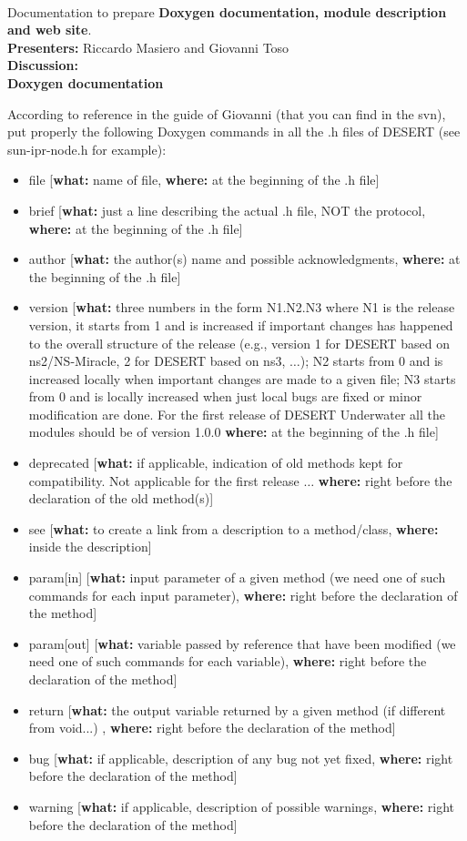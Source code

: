 \documentclass[11pt,journal,draftclsnofoot,onecolumn,twoside,letterpaper]{IEEEtran}
\theoremstyle{definition} \newtheorem{definition}[]{Definition}
\theoremstyle{theorem} \newtheorem{theorem}[]{Theorem}
\begin{document}
\  \\
 Documentation to prepare {\bf Doxygen documentation, module description and web site}.\\
{\bf Presenters:} Riccardo Masiero and Giovanni Toso\\
{\bf Discussion:}\\

{\bf Doxygen documentation}

According to reference in the guide of Giovanni (that you can find in the svn), put properly the following Doxygen commands in all the .h files of DESERT (see sun-ipr-node.h for example):
     \begin{itemize}
		\item file [{\bf what:} name of file, {\bf where:} at the beginning of the .h file]
		\item brief [{\bf what:} just a line describing the actual .h file, NOT the protocol, {\bf where:} at the beginning of the .h file]
		\item author [{\bf what:} the author(s) name and possible acknowledgments, {\bf where:} at the beginning of the .h file]
		\item version [{\bf what:} three numbers in the form N1.N2.N3 where N1 is the release version, it starts from 1 and is increased if important changes has happened to the overall structure of the release (e.g., version 1 for DESERT based on ns2/NS-Miracle, 2 for DESERT based on ns3, $\dots$); N2 starts from 0 and is increased locally when important changes are made to a given file; N3 starts from 0 and is locally increased when just local bugs are fixed or minor modification are done. For the first release of DESERT Underwater all the modules should be of version 1.0.0 {\bf where:} at the beginning of the .h file]
		\item deprecated [{\bf what:} if applicable, indication of old methods kept for compatibility. Not applicable for the first release $\dots$ {\bf where:} right before the declaration of the old method(s)]
		\item see [{\bf what:} to create a link from a description to a method/class, {\bf where:} inside the description]
		\item param[in] [{\bf what:} input parameter of a given method (we need one of such commands for each input parameter), {\bf where:} right before the declaration of the method]
		\item param[out] [{\bf what:} variable passed by reference that have been modified (we need one of such commands for each variable), {\bf where:} right before the declaration of the method]
		\item return [{\bf what:} the output variable returned by a given method (if different from void...) , {\bf where:} right before the declaration of the method]
		\item bug [{\bf what:} if applicable, description of any bug not yet fixed, {\bf where:} right before the declaration of the method]
		\item warning [{\bf what:} if applicable, description of possible warnings, {\bf where:} right before the declaration of the method]
     \end{itemize}
\end{document}

